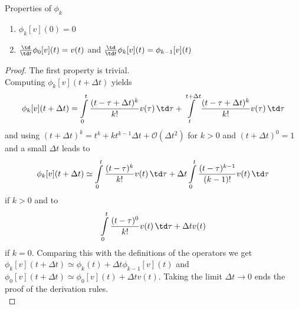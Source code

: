 \begin{lemma}{Properties of $\phi_k$}{}
	\begin{enumerate}
	\item $\phi_k[v](0) = 0$
	\item $\frac{\td}{\td t}\phi_0[v](t)=v(t)$ and
	$\frac{\td}{\td t}\phi_k[v](t) = \phi_{k-1}[v](t)$
	\end{enumerate}
\end{lemma}
\begin{proof}
	The first property is trivial.\\
	Computing $\phi_k[v](t+\Delta t)$ yields
	\begin{equation}
	\phi_k[v](t+\Delta t) = \int\limits_0^t \frac{(t-\tau + \Delta t)^k}{k!} v(\tau) 
	\, \td \tau + \int\limits_t^{t+\Delta t}   \frac{(t-\tau + \Delta t)^k}{k!} v(\tau) 
	\, \td \tau 
	\end{equation}
	and using $(t+\Delta t)^k =t^k + k t^{k-1} \Delta t + \mathcal{O}(\Delta t^2)$ for 
	$k>0$ and $(t+\Delta t)^0 = 1$ and a small $\Delta t$ leads to 
	\begin{equation}
	\phi_k[v](t+\Delta t) \simeq \int\limits_0^t \frac{(t-\tau)^k}{k!} v(t) \, \td \tau 
	+ \Delta t \int\limits_0^t \frac{(t-\tau)^{k-1}}{(k-1)!} v(t) \, \td \tau
	\end{equation}
	if $k>0$ and to 
	\begin{equation}
	\int\limits_0^t \frac{(t-\tau)^0}{k!} v(t) \, \td \tau +  \Delta t v(t)
	\end{equation}
	if $k=0$. Comparing this with the definitions of the operators we get \\
	$\phi_k[v](t+\Delta t) \simeq \phi_k(t) + \Delta t\phi_{k-1}[v](t)$ and 
	$\phi_0[v](t+\Delta t) \simeq \phi_0[v](t) + \Delta t v(t)$. Taking the limit 
	$\Delta t\to 0$ ends the proof of the derivation rules. \\
\end{proof}

